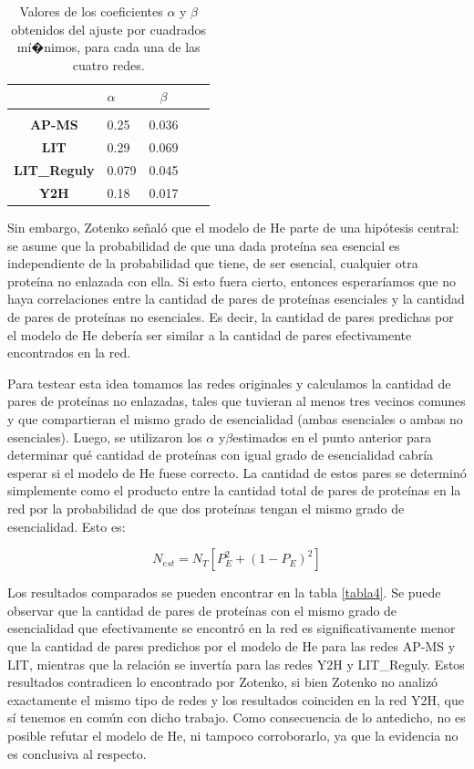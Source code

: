 \documentclass[%
 reprint,
 amsmath,amssymb,
 aps,
]{revtex4-1}
\begin{document}
\begin{table}[h]
\begin{ruledtabular}

\begin{tabular}{ c l c l c  }
{}&           {\bf     $\alpha$ }&{\bf     $\beta$}\\\hline\\
{\bf AP-MS   }&{    0.25}&{  0.036}\\
{\bf LIT   }&{     0.29  }&{0.069}\\
{\bf LIT\_Reguly }&{ 0.079 }&{ 0.045}\\
{\bf Y2H      }&{   0.18 }&{ 0.017}\\
\end{tabular}
\end{ruledtabular}
\caption{Valores de los coeficientes $\alpha$ y $\beta$ obtenidos del ajuste por cuadrados m\'i�nimos, para cada una de las cuatro redes.}
\label{tabla3}
\end{table}

Sin embargo, Zotenko se\~nal\'o que el modelo de He parte de una hip\'otesis central: se asume que la probabilidad de que una dada prote\'ina sea esencial es independiente de la probabilidad que tiene, de ser esencial, cualquier otra prote\'ina no enlazada con ella. Si esto fuera cierto, entonces esperar\'iamos que no haya correlaciones entre la cantidad de pares de prote\'inas esenciales y la cantidad de pares de prote\'inas no esenciales. Es decir, la cantidad de pares predichas por el modelo de He deber\'ia ser similar a la cantidad de pares efectivamente encontrados en la red.

Para testear esta idea tomamos las redes originales y calculamos la cantidad de pares de prote\'inas no enlazadas, tales que tuvieran al menos tres vecinos comunes y que compartieran el mismo grado de esencialidad (ambas esenciales o ambas no esenciales). Luego, se utilizaron los $\alpha$ y$\beta$estimados en el punto anterior para determinar qu\'e cantidad de prote\'inas con igual grado de esencialidad cabr\'ia esperar si el modelo de He fuese correcto. La cantidad de estos pares se determin\'o simplemente como el producto entre la cantidad total de pares de prote\'inas en la red por la probabilidad de que dos prote\'inas tengan el mismo grado de esencialidad. Esto es:

\begin{equation}
N_{est} = N_T [P_E^2+(1-P_E)^2]
\end{equation}

Los resultados comparados se pueden encontrar en la tabla \ref{tabla4}. Se puede observar que la cantidad de pares de prote\'inas con el mismo grado de esencialidad que efectivamente se encontr\'o en la red es significativamente menor que la cantidad de pares predichos por el modelo de He para las redes AP-MS y LIT, mientras que la relaci\'on se invert\'ia para las redes Y2H y LIT\_Reguly. Estos resultados contradicen lo encontrado por Zotenko, si bien Zotenko no analiz\'o exactamente el mismo tipo de redes y los resultados coinciden en la red Y2H, que s\'i tenemos en com\'un con dicho trabajo. Como consecuencia de lo antedicho, no es posible refutar el modelo de He, ni tampoco corroborarlo, ya que la evidencia no es conclusiva al respecto. 
\end{document}

